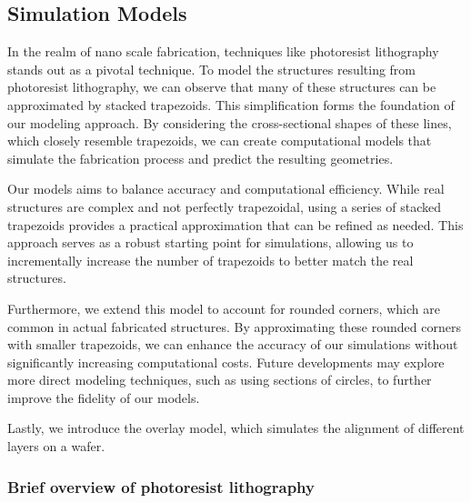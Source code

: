 \medskip

\subsection{Simulation Models}

In the realm of nano scale fabrication, techniques like photoresist lithography stands out as a pivotal technique. To model the structures 
resulting from photoresist lithography, we can observe that many of these structures can be approximated by stacked trapezoids. 
This simplification forms the foundation of our modeling approach. By considering the cross-sectional shapes of these lines, which 
closely resemble trapezoids, we can create computational models that simulate the fabrication process and predict the resulting 
geometries.

\medskip

Our models aims to balance accuracy and computational efficiency. While real structures are complex and not perfectly trapezoidal, 
using a series of stacked trapezoids provides a practical approximation that can be refined as needed. This approach serves as a robust
starting point for simulations, allowing us to incrementally increase the number of trapezoids to better match the real structures.

\medskip

Furthermore, we extend this model to account for rounded corners, which are common in actual fabricated structures. By approximating 
these rounded corners with smaller trapezoids, we can enhance the accuracy of our simulations without significantly increasing 
computational costs. Future developments may explore more direct modeling techniques, such as using sections of circles, to further
improve the fidelity of our models.

\medskip

Lastly, we introduce the overlay model, which simulates the alignment of different layers on a wafer.


\subsubsection{Brief overview of photoresist lithography}

